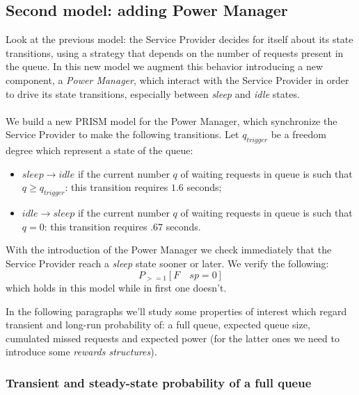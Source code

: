 \subsection{Second model: adding Power Manager}

Look at the previous model: the Service Provider decides for itself
about its state transitions, using a strategy that depends on the
number of requests present in the queue. In this new model we augment
this behavior introducing a new component, a \emph{Power Manager},
which interact with the Service Provider in order to drive its state
transitions, especially between \emph{sleep} and \emph{idle} states.
\\\\
We build a new PRISM model for the Power Manager, which synchronize
the Service Provider to make the following transitions. Let
$q_{trigger}$ be a freedom degree which represent a state of the
queue:
\begin{itemize}
\item $sleep \rightarrow idle$ if the current number $q$ of waiting
  requests in queue is such that $q \geq q_{trigger}$: this transition
  requires $1.6$ seconds;
\item $idle \rightarrow sleep$ if the current number $q$ of waiting
  requests in queue is such that $q = 0$: this transition requires
  $.67$ seconds.
\end{itemize}
With the introduction of the Power Manager we check immediately that
the Service Provider reach a \emph{sleep} state sooner or later. We
verify the following:
\begin{displaymath}
  P_{>=1} [ F\quad sp=0 ]
\end{displaymath}
which holds in this model while in first one doesn't.

In the following paragraphs we'll study some properties of interest
which regard transient and long-run probability of: a full queue,
expected queue size, cumulated missed requests and expected power (for
the latter ones we need to introduce some \emph{rewards structures}).

\subsubsection{Transient and steady-state probability of a full queue}

